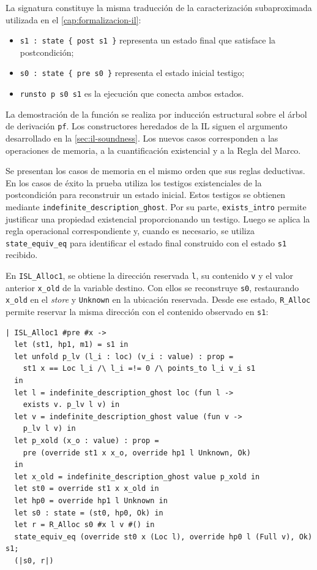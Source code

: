 \documentclass[a4paper,	11pt]{report}
\begin{document}
La signatura constituye la misma traducción de la caracterización subaproximada utilizada en el \autoref{cap:formalizacion-il}:
\begin{itemize}
  \item \lstinline|s1 : state { post s1 }| representa un estado final que satisface la postcondición;
  \item \lstinline|s0 : state { pre s0 }| representa el estado inicial testigo;
  \item \lstinline|runsto p s0 s1| es la ejecución que conecta ambos estados.
\end{itemize}

La demostración de la función se realiza por inducción estructural sobre el árbol de derivación \lstinline|pf|.
Los constructores heredados de la IL siguen el argumento desarrollado en la \autoref{sec:il-soundness}.
Los nuevos casos corresponden a las operaciones de memoria,
a la cuantificación existencial y a la Regla del Marco.

Se presentan los casos de memoria en el mismo orden que sus reglas deductivas.
En los casos de éxito
la prueba utiliza los testigos existenciales de la postcondición para reconstruir un estado inicial.
Estos testigos se obtienen mediante \lstinline|indefinite_description_ghost|.
Por su parte,
\lstinline|exists_intro| permite justificar una propiedad existencial proporcionando un testigo.
Luego se aplica la regla operacional correspondiente y,
cuando es necesario,
se utiliza \lstinline|state_equiv_eq| para identificar el estado final construido con el estado \lstinline|s1| recibido.

En \lstinline|ISL_Alloc1|,
se obtiene la dirección reservada \lstinline|l|,
su contenido \lstinline|v| y el valor anterior \lstinline|x_old| de la variable destino.
Con ellos se reconstruye \lstinline|s0|,
restaurando \lstinline|x_old| en el \emph{store} y \lstinline|Unknown| en la ubicación reservada.
Desde ese estado,
\lstinline|R_Alloc| permite reservar la misma dirección con el contenido observado en \lstinline|s1|:

\begin{lstlisting}
| ISL_Alloc1 #pre #x -> 
  let (st1, hp1, m1) = s1 in
  let unfold p_lv (l_i : loc) (v_i : value) : prop =
    st1 x == Loc l_i /\ l_i =!= 0 /\ points_to l_i v_i s1
  in
  let l = indefinite_description_ghost loc (fun l ->
    exists v. p_lv l v) in
  let v = indefinite_description_ghost value (fun v ->
    p_lv l v) in
  let p_xold (x_o : value) : prop =
    pre (override st1 x x_o, override hp1 l Unknown, Ok)
  in
  let x_old = indefinite_description_ghost value p_xold in
  let st0 = override st1 x x_old in
  let hp0 = override hp1 l Unknown in
  let s0 : state = (st0, hp0, Ok) in
  let r = R_Alloc s0 #x l v #() in
  state_equiv_eq (override st0 x (Loc l), override hp0 l (Full v), Ok) s1;
  (|s0, r|)
\end{lstlisting}
\end{document}
